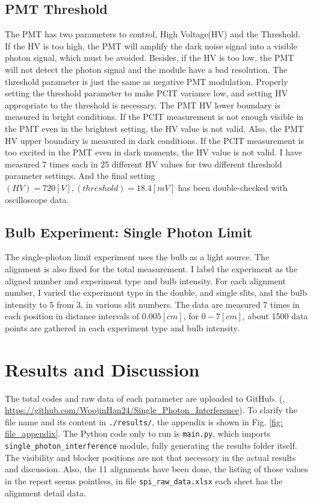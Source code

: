 \documentclass{article}
\begin{document}
\subsection{PMT Threshold}
The PMT has two parameters to control, High Voltage(HV) and the Threshold.
If the HV is too high, the PMT will amplify the dark noise signal into a visible photon signal, which must be avoided.
Besides, if the HV is too low, the PMT will not detect the photon signal and the module have a bad resolution.
The threshold parameter is just the same as negative PMT modulation.
Properly setting the threshold parameter to make PCIT variance low, and setting HV appropriate to the threshold is necessary.
The PMT HV lower boundary is measured in bright conditions.
If the PCIT measurement is not enough visible in the PMT even in the brightest setting, the HV value is not valid.
Also, the PMT HV upper boundary is measured in dark conditions.
If the PCIT measurement is too excited in the PMT even in dark moments, the HV value is not valid.
I have measured 7 times each in 25 different HV values for two different threshold parameter settings.
And the final setting $(HV) = 720 [V], (threshold) = 18.4 [mV]$ has been double-checked with oscilloscope data.

\subsection{Bulb Experiment: Single Photon Limit}
The single-photon limit experiment uses the bulb as a light source.
The alignment is also fixed for the total measurement.
I label the experiment as the aligned number and experiment type and bulb intensity.
For each alignment number, I varied the experiment type in the double, and single slits, and the bulb intensity to 5 from 3, in various slit numbers.
The data are measured 7 times in each position in distance intervals of $0.005 [cm]$, for $0 - 7 [cm]$, about 1500 data points are gathered in each experiment type and bulb intensity.

\section{Results and Discussion}
The total codes and raw data of each parameter are uploaded to GitHub.
(\cite{github}, \url{https://github.com/WoojinHan24/Single_Photon_Interference}).
To clarify the file name and its content in \verb|./results/|, the appendix is shown in Fig. \ref{fig: file_appendix}.
The Python code only to run is \verb|main.py|, which imports \verb|single_photon_interference| module, fully generating the results folder itself.
The visibility and blocker positions are not that necessary in the actual results and discussion.
Also, the 11 alignments have been done, the listing of those values in the report seems pointless, in file \verb|spi_raw_data.xlsx| each sheet has the alignment detail data.
\end{document}
